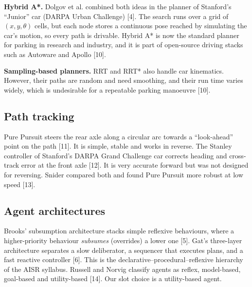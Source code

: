 \documentclass[12pt,a4paper]{article}
\begin{document}
\textbf{Hybrid A*.} Dolgov et al. combined both ideas in the planner of Stanford's ``Junior'' car (DARPA Urban Challenge) [4]. The search runs over a grid of $(x, y, \theta)$ cells, but each node stores a continuous pose reached by simulating the car's motion, so every path is drivable. Hybrid A* is now the standard planner for parking in research and industry, and it is part of open-source driving stacks such as Autoware and Apollo [10].

\textbf{Sampling-based planners.} RRT and RRT* also handle car kinematics. However, their paths are random and need smoothing, and their run time varies widely, which is undesirable for a repeatable parking manoeuvre [10].

\subsection{Path tracking}
Pure Pursuit steers the rear axle along a circular arc towards a ``look-ahead'' point on the path [11]. It is simple, stable and works in reverse. The Stanley controller of Stanford's DARPA Grand Challenge car corrects heading and cross-track error at the front axle [12]. It is very accurate forward but was not designed for reversing. Snider compared both and found Pure Pursuit more robust at low speed [13].

\subsection{Agent architectures}
Brooks' subsumption architecture stacks simple reflexive behaviours, where a higher-priority behaviour \emph{subsumes} (overrides) a lower one [5]. Gat's three-layer architecture separates a slow deliberator, a sequencer that executes plans, and a fast reactive controller [6]. This is the declarative--procedural--reflexive hierarchy of the AISR syllabus. Russell and Norvig classify agents as reflex, model-based, goal-based and utility-based [14]. Our slot choice is a utility-based agent.
\end{document}
